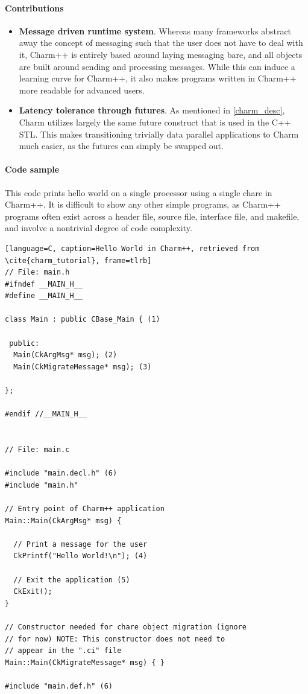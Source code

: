 \paragraph{Contributions}
	\begin{itemize}
		\item \textbf{Message driven runtime system}. Whereas many frameworks abstract away the concept of messaging such that the user does not have to deal with it, Charm++ is entirely based around laying messaging bare, and all objects are built around sending and processing messages. While this can induce a learning curve for Charm++, it also makes programs written in Charm++ more readable for advanced users.  
		\item \textbf{Latency tolerance through futures}. As mentioned in \ref{charm_desc}, Charm utilizes largely the same future construct that is used in the C++ STL. This makes transitioning trivially data parallel applications to Charm much easier, as the futures can simply be swapped out.   
		
	\end{itemize}

\paragraph{Code sample}
This code prints hello world on a single processor using a single chare in Charm++. It is difficult to show any other simple programs, as Charm++ programs often exist across a header file, source file, interface file, and makefile, and involve a nontrivial degree of code complexity.
\scriptsize
\begin{minipage}{0.45\textwidth}
\begin{lstlisting}[language=C, caption=Hello World in Charm++, retrieved from \cite{charm_tutorial}, frame=tlrb]
// File: main.h
#ifndef __MAIN_H__
#define __MAIN_H__

class Main : public CBase_Main { (1)

 public:
  Main(CkArgMsg* msg); (2)
  Main(CkMigrateMessage* msg); (3)

};

#endif //__MAIN_H__


// File: main.c

#include "main.decl.h" (6)
#include "main.h"

// Entry point of Charm++ application
Main::Main(CkArgMsg* msg) {

  // Print a message for the user
  CkPrintf("Hello World!\n"); (4)

  // Exit the application (5)
  CkExit();
}

// Constructor needed for chare object migration (ignore
// for now) NOTE: This constructor does not need to
// appear in the ".ci" file
Main::Main(CkMigrateMessage* msg) { }

#include "main.def.h" (6)
	
\end{lstlisting}
\end{minipage}

